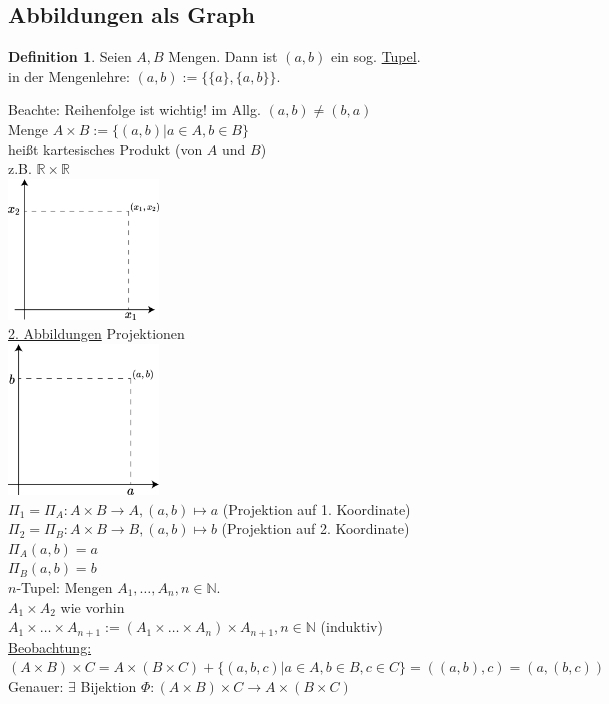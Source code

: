 \documentclass[12pt,a4paper,titlepage]{article} %
\theoremstyle{definition}
\newtheorem{defi}{Definition}[subsection]
\theoremstyle{remark}
\begin{document}
\subsection{Abbildungen als Graph}
\begin{defi}
	Seien $A,B$ Mengen. Dann ist $(a,b)$ ein sog. \underline{Tupel}.\\
	in der Mengenlehre: $(a,b) := \{\{a\}, \{a,b\}\}$.
\end{defi}
Beachte: Reihenfolge ist wichtig! im Allg. $(a,b)\neq (b,a)$\\
Menge $A\times B := \{(a,b)|a\in A, b\in B\}$\\
heißt kartesisches Produkt (von $A$ und $B$)\\
z.B. $\mathbb{R}\times\mathbb{R}$\\
\includegraphics[width=0.3\textwidth]{images/img03.png}\\
\underline{2. Abbildungen} Projektionen\\
\includegraphics[width=0.3\textwidth]{images/img04.png}\\
$\Pi_1 = \Pi_A : A\times B \rightarrow A, (a,b)\mapsto a$ (Projektion auf 1. Koordinate)\\
$\Pi_2 = \Pi_B : A\times B \rightarrow B, (a,b) \mapsto b$ (Projektion auf 2. Koordinate)\\
$\Pi_A(a,b) = a$\\
$\Pi_B(a,b) = b$\\
$n$-Tupel: Mengen $A_1,\dots ,A_n, n\in \mathbb{N}.$\\
$A_1\times A_2$ wie vorhin\\
$A_1\times\dots\times A_{n+1} := (A_1\times\dots\times A_n)\times A_{n+1}, n\in \mathbb{N}$ (induktiv)\\
\underline{Beobachtung:}\\
$(A\times B)\times C = A\times (B\times C) + \{(a,b,c)|a\in A, b\in B, c\in C\} = ((a,b),c) = (a,(b,c))$\\
Genauer: $\exists$ Bijektion $\Phi : (A\times B) \times C \rightarrow A\times (B\times C)$
\end{document}
